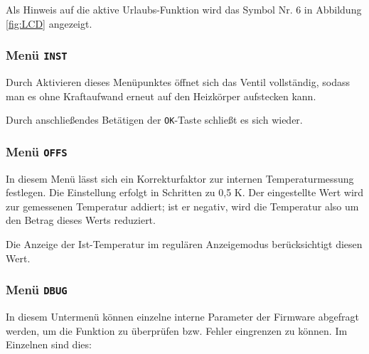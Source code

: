 \documentclass[a4paper]{article}
\begin{document}
Als Hinweis auf die aktive Urlaubs-Funktion wird das Symbol Nr. 6
in Abbildung \ref{fig:LCD} angezeigt.

\subsubsection {
  Menü \texttt{INST}
}

Durch Aktivieren dieses Menüpunktes öffnet sich das Ventil
vollständig, sodass man es ohne Kraftaufwand erneut auf
den Heizkörper aufstecken kann.

Durch anschließendes Betätigen der \texttt{OK}-Taste schließt
es sich wieder.

\subsubsection {
  Menü \texttt{OFFS}
}

In diesem Menü lässt sich ein Korrekturfaktor zur internen
Temperaturmessung festlegen.  Die Einstellung erfolgt in Schritten zu
0,5 K.  Der eingestellte Wert wird zur gemessenen Temperatur addiert;
ist er negativ, wird die Temperatur also um den Betrag dieses Werts
reduziert.

Die Anzeige der Ist-Temperatur im regulären Anzeigemodus
berücksichtigt diesen Wert.

\subsubsection {
  Menü \texttt{DBUG}
}

In diesem Untermenü können einzelne interne Parameter der Firmware
abgefragt werden, um die Funktion zu überprüfen bzw. Fehler eingrenzen
zu können.  Im Einzelnen sind dies:
\end{document}
